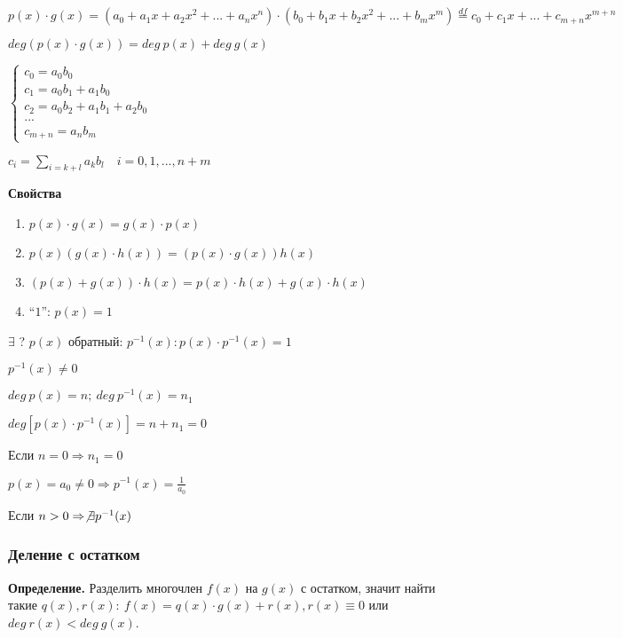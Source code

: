 \documentclass{article}
\begin{document}
    \( p(x)\cdot g(x) = (a_0 + a_1x + a_2x^2 + ... + a_nx^n)\cdot(b_0 + b_1x + b_2x^2 + ... + b_mx^m) \stackrel{df}{=} c_0 + c_1x + ... + c_{m + n}x^{m + n} \)

    \( deg(p(x)\cdot g(x)) = deg\ p(x) + deg\ g(x) \)
    
    \(\begin{cases}
        c_0 = a_0b_0\\
        c_1 = a_0b_1+a_1b_0\\
        c_2 = a_0b_2+a_1b_1+a_2b_0\\
        ...\\
        c_{m+n}=a_nb_m
    \end{cases}\)
    
    \( c_i = \sum_{i = k + l} a_kb_l \quad i = 0, 1, ..., n + m  \)
    
    \textbf{Свойства}

    \begin{enumerate}
        \item \( p(x)\cdot g(x) = g(x) \cdot p(x) \)
        \item \( p(x)(g(x)\cdot h(x)) = (p(x)\cdot g(x))h(x) \)
        \item \((p(x)+g(x))\cdot h(x) = p(x)\cdot h(x)+g(x)\cdot h(x)\)
        \item ``$1$'': \(p(x) = 1\) 
    \end{enumerate}

    \( \exists \) ? \(p(x)\) обратный: \( p^{-1}(x): p(x)\cdot p^{-1}(x) = 1 \)

    \( p^{-1}(x) \neq 0 \)

    \( deg\ p(x) = n;\ deg\ p^{-1}(x) = n_1 \)

    \( deg[p(x)\cdot p^{-1}(x)] = n + n_1 = 0 \)

    Если \( n = 0 \Rightarrow n_1 = 0 \) 

    \( p(x) = a_0 \neq 0 \Rightarrow p^{-1}(x) = \frac{1}{a_0} \)

    Если \( n > 0 \Rightarrow \not\exists p^{-1}(x) \)

    \subsubsection{Деление с остатком}

    \textbf{Определение.} Разделить многочлен \(f(x)\) на \(g(x)\) с остатком, значит найти такие \(q(x), r(x):\ f(x) = q(x) \cdot g(x) + r(x), r(x) \equiv 0\) или \(deg\ r(x) < deg\ g(x)\).

    
\end{document}
